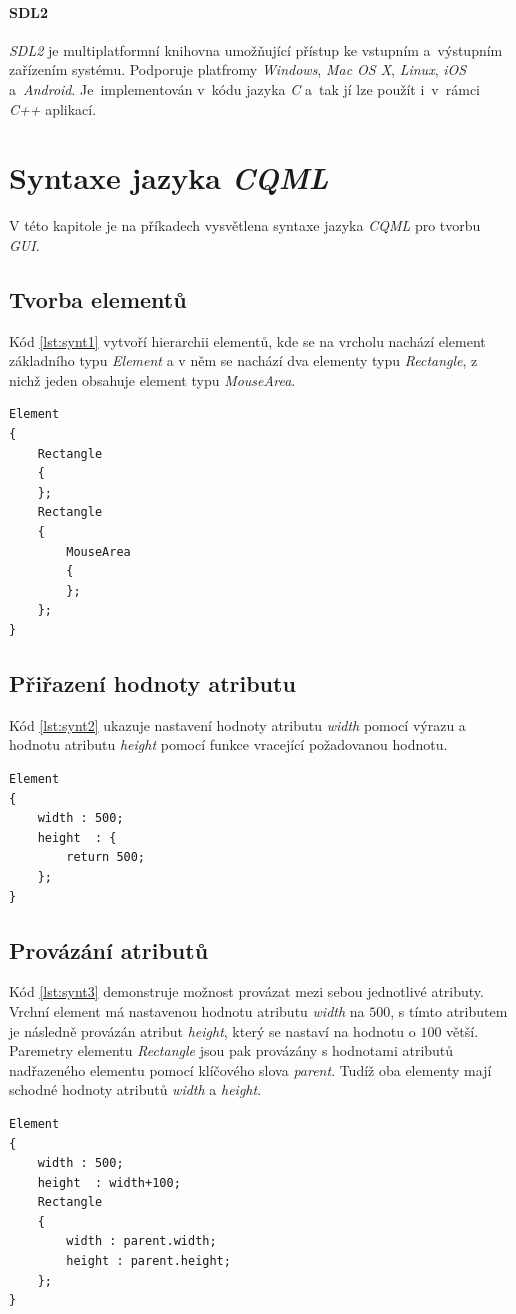 \documentclass[11pt,twoside,a4paper]{book}
\begin{document}
\subsubsection{SDL2}
\textit{SDL2} je multiplatformní knihovna umožňující přístup ke vstupním a~výstupním zařízením systému. Podporuje platfromy \textit{Windows}, \textit{Mac OS X}, \textit{Linux}, \textit{iOS} a~\textit{Android}. Je~implementován v~kódu jazyka \textit{C} a~tak jí lze použít i~v~rámci \textit{C++} aplikací.


\chapter{\label{CH:APF}Syntaxe jazyka \textit{CQML}}
V této kapitole je na příkadech vysvětlena syntaxe jazyka \textit{CQML} pro tvorbu \textit{GUI}.

\section{Tvorba elementů}
Kód \ref{lst:synt1} vytvoří hierarchii elementů, kde se na vrcholu nachází element základního typu \textit{Element} a v něm se nachází dva elementy typu \textit{Rectangle}, z nichž jeden obsahuje element typu \textit{MouseArea}.
\begin{lstlisting}[frame=single,caption=Syntaxe pro tvorbu hierarchie elementů.,label=lst:synt1]
Element
{
	Rectangle
	{
	};
	Rectangle
	{
		MouseArea
		{
		};
	};
}
\end{lstlisting}

\section{Přiřazení hodnoty atributu}
Kód \ref{lst:synt2} ukazuje nastavení hodnoty atributu \textit{width} pomocí výrazu a hodnotu atributu \textit{height} pomocí funkce vracející požadovanou hodnotu.
\begin{lstlisting}[float,frame=single,caption=Syntaxe přiřazení hodnoty elementu pomocí výrazu nebo funkce.,label=lst:synt2]
Element
{
	width : 500;
	height  : {
		return 500;
	};
}
\end{lstlisting}

\section{Provázání atributů}
Kód \ref{lst:synt3} demonstruje možnost provázat mezi sebou jednotlivé atributy. Vrchní element má nastavenou hodnotu atributu \textit{width} na $500$, s tímto atributem je následně provázán atribut \textit{height}, který se nastaví na hodnotu o $100$ větší. Paremetry elementu \textit{Rectangle} jsou pak provázány s hodnotami atributů nadřazeného elementu pomocí klíčového slova \textit{parent}. Tudíž oba elementy mají schodné hodnoty atributů \textit{width} a \textit{height}.
\begin{lstlisting}[frame=single,caption=Ukázka provázání atributů mezi sebou.,label=lst:synt3]
Element
{
	width : 500;
	height  : width+100;
	Rectangle
	{
		width : parent.width;
		height : parent.height;
	};
}
\end{lstlisting}
\end{document}

